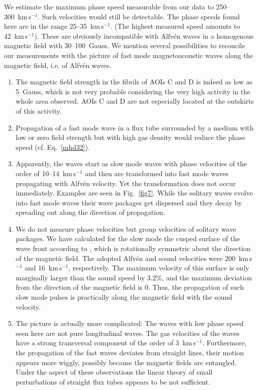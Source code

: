 We estimate the maximum phase speed measurable from our data to 250--300~km\,s$^{-1}$. Such velocities would still be detectable. The phase speeds found here are in the range 25--35~km\,s$^{-1}$. (The highest measured speed amounts to 42~km\,s$^{-1}$). These are obviously incompatible with Alfv\'en waves in a homogenous magnetic field with 30--100~Gauss. We mention several {possibilities} to reconcile our measurements with the picture of fast mode magnetoacoustic waves along the magnetic field, i.e. of Alfv\'en waves.
\begin{enumerate}
\item
The magnetic field strength in the fibrils of AOIs C and D is indeed as low as 5~Gauss, which is not very probable considering the very high activity in the whole area observed. AOIs C and D are not especially located at the outskirts of this activity.
\item
Propagation of a fast mode wave in a flux tube surrounded by a medium with low or zero field strength but with high gas density would reduce the phase speed (cf. Eq.~\ref{mhd32}).
\item
Apparently, the waves start as slow mode waves with phase velocities of the order of 10--14~km\,s$^{-1}$ and then are transformed into fast mode waves propagating with Alfv\'en velocity. Yet the transformation does not occur immediately. Examples are seen in Fig.~\ref{fig7}. While the solitary waves evolve into fast mode waves their wave packages get dispersed and they decay by spreading out along the direction of propagation.
\item
We do not measure phase velocities but group velocities of solitary wave packages. We have calculated for the slow mode the cusped surface of the wave front according to \citet[][cf. their Fig.~13]{ferraro66}, which is rotationally symmetric about the direction of the magnetic field. The adopted Alfv\'en and sound velocities were 200~km\,s$^{-1}$ and 16~km\,s$^{-1}$, respectively. The maximum velocity of this surface is only marginally larger than the sound speed by 3.2\%, and the maximum deviation from the direction of the magnetic field is 0. Thus, the propagation of such slow mode pulses is practically along the magnetic field with the sound velocity. 

\item
The picture is actually more complicated: The waves with low phase speed seen here are not pure longitudinal waves. The gas velocities of the waves have a strong transversal component of the order of 3~km\,s$^{-1}$. Furthermore, the propagation of the fast waves deviates from straight lines, their motion appears more wiggly, possibly because the magnetic fields are entangled. Under the aspect of these observations the linear theory of small perturbations of straight flux tubes appears to be not sufficient.
\end{enumerate}


